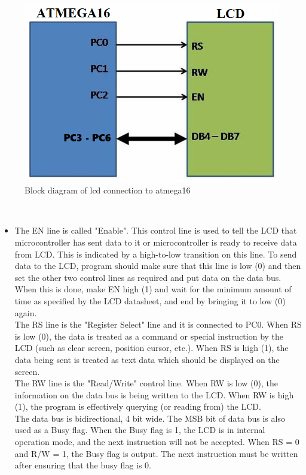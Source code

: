 \documentclass[a4paper,12pt,oneside]{book}
\begin{document}
	\hfill\\
	\begin{figure}[h!]
		\caption{Block diagram of lcd connection to atmega16}
		\includegraphics[width=\textwidth]{./HardwareManual/lcd.png}
	\end{figure}	
	\hfill\\
	
	\begin{itemize}
	\item {
		The EN line is called "Enable". This control line is used to tell the
		LCD that microcontroller has sent data to it or microcontroller is ready to receive data from
		LCD. This is indicated by a high-to-low transition on this line. To send data to the LCD, program
		should make sure that this line is low (0) and then set the other two control lines as required and
		put data on the data bus. When this is done, make EN high (1) and wait for the minimum amount
		of time as specified by the LCD datasheet, and end by bringing it to low (0) again.\\
		The RS line is the "Register Select" line and it is connected to PC0. When RS is low (0), the data
		is treated as a command or special instruction by the LCD (such as clear screen, position cursor,
		etc.). When RS is high (1), the data being sent is treated as text data which should be displayed
		on the screen.\\
		The RW line is the "Read/Write" control line. When RW is low (0),
		the information on the data bus is being written to the LCD. When RW is high (1), the program
		is effectively querying (or reading from) the LCD.\\
		The data bus is bidirectional, 4 bit wide.
		The MSB bit of data bus is also used as a Busy flag. When the Busy flag is 1, the LCD is
		in internal operation mode, and the next instruction will not be accepted. When RS = 0 and R/W
		= 1, the Busy flag is output. The next instruction must be written after ensuring that the
		busy flag is 0.
	}
	\end{itemize}
\end{document}
